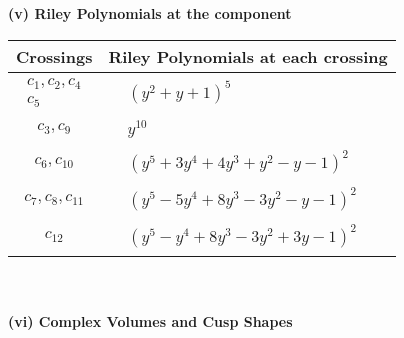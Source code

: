 \documentclass[1p]{elsarticle_modified}
\theoremstyle{definition}
\begin{document}
\newpage\renewcommand{\arraystretch}{1}
\flushleft \textbf{(v) Riley Polynomials at the component}\newline \\
\begin{tabular}{m{50pt}|m{274pt}}
Crossings & \hspace{64pt}Riley Polynomials at each crossing \\
\hline $$\begin{aligned}c_{1},c_{2},c_{4}\\c_{5}\end{aligned}$$&$\begin{aligned}
&(y^2+y+1)^5
\end{aligned}$\\
\hline $$\begin{aligned}c_{3},c_{9}\end{aligned}$$&$\begin{aligned}
&y^{10}
\end{aligned}$\\
\hline $$\begin{aligned}c_{6},c_{10}\end{aligned}$$&$\begin{aligned}
&(y^5+3 y^4+4 y^3+y^2- y-1)^2
\end{aligned}$\\
\hline $$\begin{aligned}c_{7},c_{8},c_{11}\end{aligned}$$&$\begin{aligned}
&(y^5-5 y^4+8 y^3-3 y^2- y-1)^2
\end{aligned}$\\
\hline $$\begin{aligned}c_{12}\end{aligned}$$&$\begin{aligned}
&(y^5- y^4+8 y^3-3 y^2+3 y-1)^2
\end{aligned}$\\
\hline
\end{tabular}\\~\\
\newpage\flushleft \textbf{(vi) Complex Volumes and Cusp Shapes}
\end{document}
